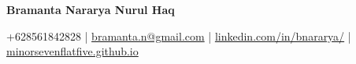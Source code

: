 \begin{center}
    \textbf{\huge Bramanta Nararya Nurul Haq}
\end{center}

\begin{center}
    +628561842828 | \href{mailto:bramanta.n@gmail.com}{bramanta.n@gmail.com} | \href{https://linkedin.com/in/bnararya/}{linkedin.com/in/bnararya/} | \href{https://minorsevenflatfive.github.io}{minorsevenflatfive.github.io}
\end{center}